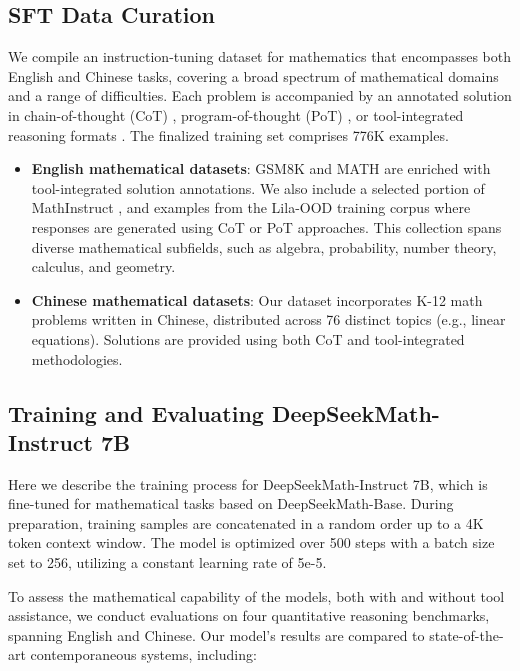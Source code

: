 \subsection{SFT Data Curation}

We compile an instruction-tuning dataset for mathematics that encompasses both English and Chinese tasks, covering a broad spectrum of mathematical domains and a range of difficulties. Each problem is accompanied by an annotated solution in chain-of-thought (CoT) \citep{cot}, program-of-thought (PoT) \citep{pot,pal}, or tool-integrated reasoning formats \citep{tora}. The finalized training set comprises 776K examples.

\begin{itemize}[topsep=0pt]
    \item \textbf{English mathematical datasets}: GSM8K and MATH are enriched with tool-integrated solution annotations. We also include a selected portion of MathInstruct \citep{MathInstruct}, and examples from the Lila-OOD training corpus \citep{lila} where responses are generated using CoT or PoT approaches. This collection spans diverse mathematical subfields, such as algebra, probability, number theory, calculus, and geometry.
    \item \textbf{Chinese mathematical datasets}: Our dataset incorporates K-12 math problems written in Chinese, distributed across 76 distinct topics (e.g., linear equations). Solutions are provided using both CoT and tool-integrated methodologies.
\end{itemize}

\subsection{Training and Evaluating DeepSeekMath-Instruct 7B}

Here we describe the training process for DeepSeekMath-Instruct 7B, which is fine-tuned for mathematical tasks based on DeepSeekMath-Base. During preparation, training samples are concatenated in a random order up to a 4K token context window. The model is optimized over 500 steps with a batch size set to 256, utilizing a constant learning rate of 5e-5.

To assess the mathematical capability of the models, both with and without tool assistance, we conduct evaluations on four quantitative reasoning benchmarks, spanning English and Chinese. Our model's results are compared to state-of-the-art contemporaneous systems, including:

